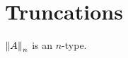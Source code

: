 \documentclass[hott-all.tex]{subfiles}
\begin{document}
\section{Truncations}
% 
% 
% 
% 
% 
% 
\begin{lem}
  $\trunc n A$ is an $n$-type.
\end{lem}
\end{document}
